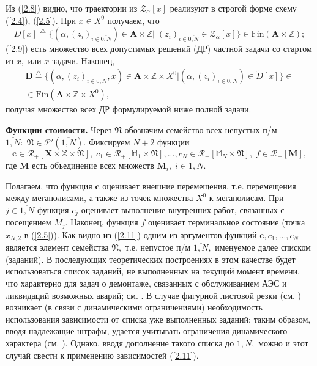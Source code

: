 \documentclass[10pt]{SPIIRAS_Proceedings}
\begin{document}
Из (\ref{2.8}) видно,
что траектории из
$\mathcal{Z}_\alpha[x]$
реализуют в строгой форме схему (\ref{2.4}), (\ref{2.5}).
При $x \in X^0$
получаем, что
\begin{equation}\label{2.9}
  \tilde{D}[x] \stackrel{\triangle}{=}
  \{(\alpha,(z_i)_{i \in \overline{0,N}}) \in \mathbf{A} \times \mathbb{Z}
  \vert \;(z_i)_{i \in \overline{0,N}} \in \mathcal{Z}_\alpha[x]\}
  \in \mathrm{Fin}(\mathbf{A} \times \mathbb{Z});
\end{equation}
(\ref{2.9}) есть множество всех допустимых решений (ДР)
частной задачи со стартом из $x,$ или $x$-задачи.
Наконец,
\begin{multline}\label{2.10}
  \mathbf{D} \stackrel{\triangle}{=}
  \{(\alpha,(z_i)_{i \in \overline{0,N}},x) \in \mathbf{A} \times \mathbb{Z} \times X^0 \vert
  (\alpha,(z_i)_{i \in \overline{0,N}}) \in \tilde{D}[x]\}
  \in
  \\
  \in \mathrm{Fin}(\mathbf{A} \times \mathbb{Z} \times X^0),
\end{multline}
получая множество всех ДР формулируемой ниже полной задачи.

{\bf Функции стоимости.}
Через $\mathfrak{N}$
обозначим семейство всех непустых п/м
$\overline{1,N}:\;\mathfrak{N} \in \mathcal{P}'(\overline{1,N}).$
Фиксируем $N + 2$ функции
\begin{equation}\label{2.11}
  \mathbf{c} \in \mathcal{R}_+[\mathbf{X} \times \mathbb{X} \times \mathfrak{N}],\;
  c_1 \in \mathcal{R}_+[\mathbb{M}_1 \times \mathfrak{N}],...,
  c_N \in \mathcal{R}_+[\mathbb{M}_N \times \mathfrak{N}],\;
  f \in \mathcal{R}_+[\mathbf{M}],
\end{equation}
где $\mathbf{M}$
есть объединение всех множеств
$\mathbf{M}_i,\;i \in \overline{1,N}.$

Полагаем, что функция $\mathbf{c}$ оценивает внешние перемещения,
т.е. перемещения между мегаполисами,
а также из точек множества $X^0$ к мегаполисам.
При $j \in \overline{1,N}$
функция $c_j$
оценивает выполнение внутренних работ,
связанных с посещением $M_j.$
Наконец, функция $f$
оценивает терминальное состояние
(точка $x_{N,2}$
в (\ref{2.5})).
Как видно из (\ref{2.11})
одним из аргументов функций $\mathbf{c},c_1,...,c_N$
является элемент семейства $\mathfrak{N},$
т.е. непустое п/м $\overline{1,N},$
именуемое далее списком (заданий).
В последующих теоретических построениях
в этом качестве будет использоваться список заданий,
не выполненных на текущий момент времени,
что характерно для задач о демонтаже,
связанных с обслуживанием АЭС и ликвидаций возможных аварий;
см. \cite{1,2,3}.
В случае фигурной листовой резки
(см. \cite{4}) возникает
(в связи с динамическими ограничениями)
необходимость использования зависимости
от списка уже выполненных заданий;
таким образом, вводя надлежащие штрафы,
удается учитывать ограничения динамического характера
(см. \cite{18}).
Однако, вводя дополнение такого списка до
$\overline{1,N},$
можно и этот случай свести к применению зависимостей
(\ref{2.11}).
\end{document}
